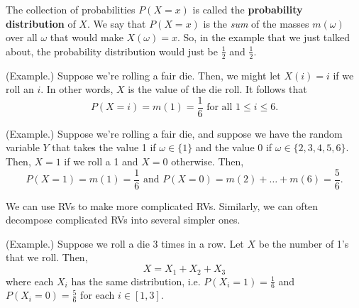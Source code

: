 \documentclass[letterpaper]{article}
\begin{document}
\bigskip 

The collection of probabilities $P(X = x)$ is called the \textbf{probability distribution} of $X$. We say that $P(X = x)$ is the \emph{sum} of the masses $m(\omega)$ over all $\omega$ that would make $X(\omega) = x$. So, in the example that we just talked about, the probability distribution would just be $\frac{1}{2}$ and $\frac{1}{2}$. 

\begin{mdframed}[]
    (Example.) Suppose we're rolling a fair die. Then, we might let $X(i) = i$ if we roll an $i$. In other words, $X$ is the value of the die roll. It follows that 
    \[P(X = i) = m(1) = \frac{1}{6} \text{ for all } 1 \leq i \leq 6.\]
\end{mdframed}

\begin{mdframed}[]
    (Example.) Suppose we're rolling a fair die, and suppose we have the random variable $Y$ that takes the value 1 if $\omega \in \{1\}$ and the value 0 if $\omega \in \{2, 3, 4, 5, 6\}$. Then, $X = 1$ if we roll a 1 and $X = 0$ otherwise. Then,
    \[P(X = 1) = m(1) = \frac{1}{6} \text{ and } P(X = 0) = m(2) + \dots + m(6) = \frac{5}{6}.\]
\end{mdframed}

We can use RVs to make more complicated RVs. Similarly, we can often decompose complicated RVs into several simpler ones. 

\begin{mdframed}[]
    (Example.) Suppose we roll a die 3 times in a row. Let $X$ be the number of 1's that we roll. Then, 
    \[X = X_1 + X_2 + X_3\]
    where each $X_i$ has the same distribution, i.e. $P(X_i = 1) = \frac{1}{6}$ and $P(X_i = 0) = \frac{5}{6}$ for each $i \in [1, 3]$. 
\end{mdframed}
\end{document}
